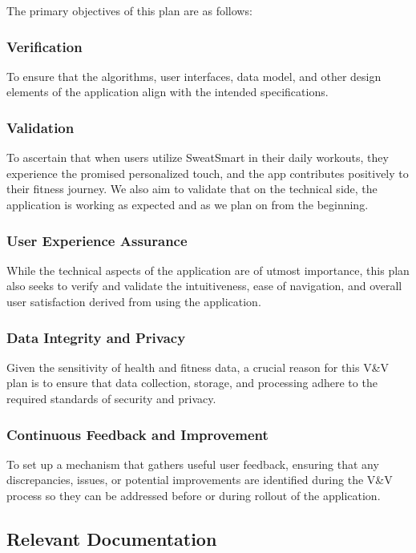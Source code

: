 \documentclass[12pt, titlepage]{article}
\begin{document}
    The primary objectives of this plan are as follows:

    \subsubsection{Verification}
    To ensure that the algorithms, user interfaces, data model, and other design elements of the application align with the intended specifications.

    \subsubsection{Validation}
    To ascertain that when users utilize SweatSmart in their daily workouts, they experience the promised personalized touch, and the app contributes positively to their fitness journey. We also aim to validate that on the technical side, the application is working as expected and as we plan on from the beginning.

    \subsubsection{User Experience Assurance}
    While the technical aspects of the application are of utmost importance, this plan also seeks to verify and validate the intuitiveness, ease of navigation, and overall user satisfaction derived from using the application.

    \subsubsection{Data Integrity and Privacy}
    Given the sensitivity of health and fitness data, a crucial reason for this V\&V plan is to ensure that data collection, storage, and processing adhere to the required standards of security and privacy.

    \subsubsection{Continuous Feedback and Improvement}
    To set up a mechanism that gathers useful user feedback, ensuring that any discrepancies, issues, or potential improvements are identified during the V\&V process so they can be addressed before or during rollout of the application.

    \subsection{Relevant Documentation}
\end{document}
